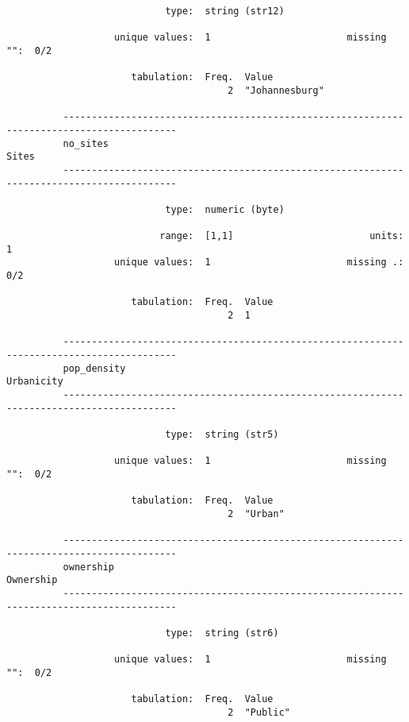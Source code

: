 \documentclass{article}
\begin{document}
\begin{verbatim}
                            type:  string (str12)
          
                   unique values:  1                        missing "":  0/2
          
                      tabulation:  Freq.  Value
                                       2  "Johannesburg"
          
          ------------------------------------------------------------------------------------------
          no_sites                                                                             Sites
          ------------------------------------------------------------------------------------------
          
                            type:  numeric (byte)
          
                           range:  [1,1]                        units:  1
                   unique values:  1                        missing .:  0/2
          
                      tabulation:  Freq.  Value
                                       2  1
          
          ------------------------------------------------------------------------------------------
          pop_density                                                                     Urbanicity
          ------------------------------------------------------------------------------------------
          
                            type:  string (str5)
          
                   unique values:  1                        missing "":  0/2
          
                      tabulation:  Freq.  Value
                                       2  "Urban"
          
          ------------------------------------------------------------------------------------------
          ownership                                                                        Ownership
          ------------------------------------------------------------------------------------------
          
                            type:  string (str6)
          
                   unique values:  1                        missing "":  0/2
          
                      tabulation:  Freq.  Value
                                       2  "Public"
          

\end{verbatim}
\end{document}
